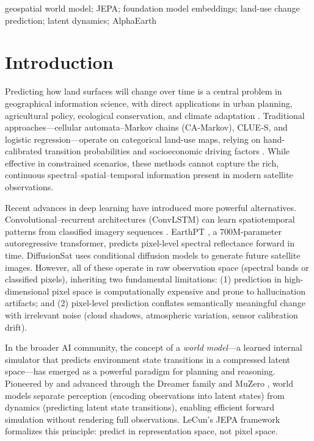 \documentclass{article}
\begin{document}
\begin{keywords}
geospatial world model; JEPA; foundation model embeddings; land-use change prediction; latent dynamics; AlphaEarth
\end{keywords}

\section{Introduction}
\label{sec:intro}

Predicting how land surfaces will change over time is a central problem in geographical information science, with direct applications in urban planning, agricultural policy, ecological conservation, and climate adaptation \citep{verburg2004lulc}. Traditional approaches---cellular automata--Markov chains (CA-Markov), CLUE-S, and logistic regression---operate on categorical land-use maps, relying on hand-calibrated transition probabilities and socioeconomic driving factors \citep{veldkamp2004clues}. While effective in constrained scenarios, these methods cannot capture the rich, continuous spectral--spatial--temporal information present in modern satellite observations.

Recent advances in deep learning have introduced more powerful alternatives. Convolutional--recurrent architectures (ConvLSTM) can learn spatiotemporal patterns from classified imagery sequences \citep{shi2015convlstm}. EarthPT \citep{smith2023earthpt}, a 700M-parameter autoregressive transformer, predicts pixel-level spectral reflectance forward in time. DiffusionSat \citep{khanna2023diffusionsat} uses conditional diffusion models to generate future satellite images. However, all of these operate in raw observation space (spectral bands or classified pixels), inheriting two fundamental limitations: (1) prediction in high-dimensional pixel space is computationally expensive and prone to hallucination artifacts; and (2) pixel-level prediction conflates semantically meaningful change with irrelevant noise (cloud shadows, atmospheric variation, sensor calibration drift).

In the broader AI community, the concept of a \textit{world model}---a learned internal simulator that predicts environment state transitions in a compressed latent space---has emerged as a powerful paradigm for planning and reasoning. Pioneered by \citet{ha2018world} and advanced through the Dreamer family \citep{hafner2023dreamerv3} and MuZero \citep{schrittwieser2020muzero}, world models separate perception (encoding observations into latent states) from dynamics (predicting latent state transitions), enabling efficient forward simulation without rendering full observations. LeCun's JEPA framework \citep{lecun2022jepa} formalizes this principle: predict in representation space, not pixel space.
\end{document}
